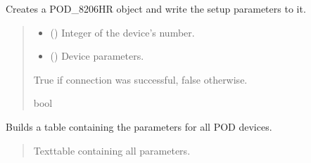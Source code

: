 \documentclass[letterpaper,10pt,english]{sphinxmanual}
\begin{document}
\begin{fulllineitems}
\begin{fulllineitems}
\label{\detokenize{Setup.SetupOneDevice:Setup.SetupOneDevice.Setup_8401HR.Setup8401HR._ConnectPODdevice}}
\pysigstartsignatures
{}
\pysigstopsignatures
\sphinxAtStartPar
Creates a POD\_8206HR object and write the setup parameters to it.
\begin{quote}\begin{description}
\begin{itemize}
\item {} 
\sphinxAtStartPar
{} () \textendash{} Integer of the device’s number.

\item {} 
\sphinxAtStartPar
{} () \textendash{} Device parameters.

\end{itemize}

\sphinxAtStartPar
True if connection was successful, false otherwise.

\sphinxAtStartPar
bool

\end{description}\end{quote}

\end{fulllineitems}


\begin{fulllineitems}
\label{\detokenize{Setup.SetupOneDevice:Setup.SetupOneDevice.Setup_8401HR.Setup8401HR._GetPODdeviceParameterTable}}
\pysigstartsignatures
{}
\pysigstopsignatures
\sphinxAtStartPar
Builds a table containing the parameters for all POD devices.
\begin{quote}\begin{description}
\sphinxAtStartPar
Texttable containing all parameters.


\end{description}
\end{quote}
\end{fulllineitems}
\end{fulllineitems}
\end{document}
